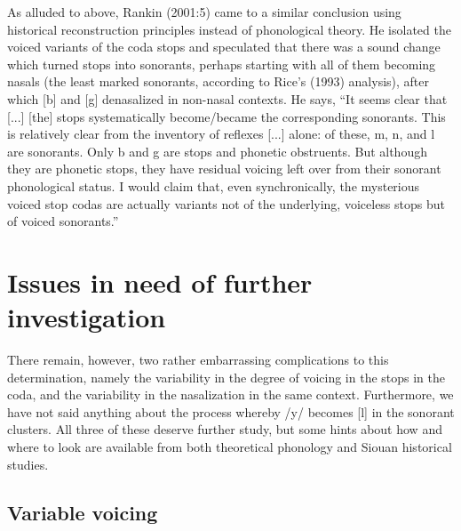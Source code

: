\documentclass[output=paper]{LSP/langsci}
\begin{document}
As alluded to above, Rankin (2001:5) came to a similar conclusion using historical reconstruction principles instead of phonological theory. He isolated the voiced variants of the coda stops and speculated that there was a sound change which turned stops into sonorants, perhaps starting with all of them becoming nasals (the least marked sonorants, according to Rice's (1993) analysis), after which [b] and [g] denasalized in non-nasal contexts. He says, ``It seems clear that [...] [the] stops systematically become/became the corresponding sonorants. This is relatively clear from the inventory of reflexes [...] alone: of these, m, n,  and l are sonorants. Only b and g are stops and phonetic obstruents. But although they are phonetic stops, they have residual voicing left over from their sonorant phonological status. I would claim that, even synchronically, the mysterious voiced stop codas are actually variants not of the underlying, voiceless stops but of voiced sonorants.''

\section{Issues in need of further investigation}

There remain, however, two rather embarrassing complications to this determination, namely the variability in the degree of voicing in the stops in the coda, and the variability in the nasalization in the same context. Furthermore, we have not said anything about the process whereby /y/ becomes [l] in the sonorant clusters. All three of these deserve further study, but some hints about how and where to look are available from both theoretical phonology and Siouan historical studies.

\subsection{Variable voicing}
\end{document}
